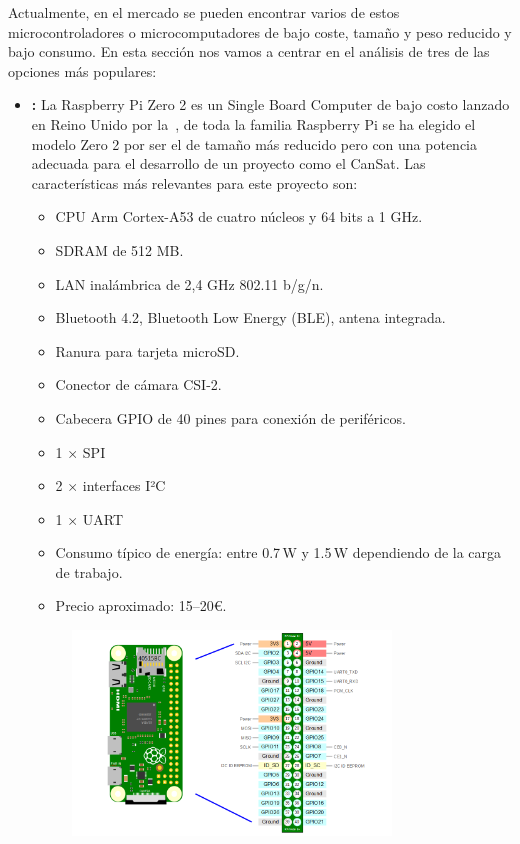 Actualmente, en el mercado se pueden encontrar varios de estos microcontroladores o microcomputadores de bajo coste, tamaño y peso reducido y bajo consumo.
En esta sección nos vamos a centrar en el análisis de tres de las opciones más populares:
\begin{itemize}

    \item \textbf{\cite{raspberrypi_zero2}:}
    La Raspberry Pi Zero 2 es un Single Board Computer de bajo costo lanzado en Reino Unido por la~\cite{raspberrypi_foundation},
    de toda la familia Raspberry Pi se ha elegido el modelo Zero 2 por ser el de tamaño más reducido pero con una potencia adecuada para el desarrollo de un proyecto como el CanSat.
    Las características más relevantes para este proyecto son:
    \begin{itemize}
        \item CPU Arm Cortex-A53 de cuatro núcleos y 64 bits a 1 GHz.
        \item SDRAM de 512 MB.
        \item LAN inalámbrica de 2,4 GHz 802.11 b/g/n.
        \item Bluetooth 4.2, Bluetooth Low Energy (BLE), antena integrada.
        \item Ranura para tarjeta microSD.
        \item Conector de cámara CSI-2.
        \item Cabecera GPIO de 40 pines para conexión de periféricos.
        \item 1 × SPI
        \item 2 × interfaces I²C
        \item 1 × UART
        \item Consumo típico de energía: entre 0.7\,W y 1.5\,W dependiendo de la carga de trabajo.
        \item Precio aproximado: 15–20€.
    \end{itemize}
    \begin{figure}[h]
        \centering
        \includegraphics[width=0.8\textwidth]{Imagenes/Bitmap/pizero2gpio}

\end{figure}
\end{itemize}

